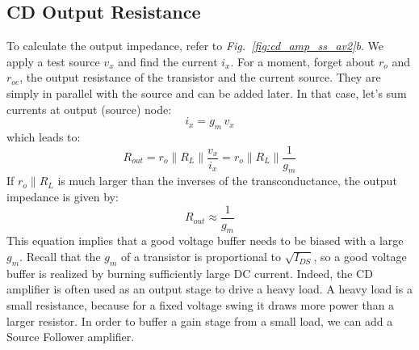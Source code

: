 \subsection{CD Output Resistance}
To calculate the output impedance, refer to \emph{Fig.~\ref{fig:cd_amp_ss_av2}b}.  We apply a test source $v_x$ and find the current $i_x$.  For a moment, forget about $r_o$ and $r_{oc}$, the output resistance of the transistor and the current source.  They are simply in parallel with the source and can be added later.  In that case, let's sum currents at output (source) node:
    \begin{equation}
        i_x = g_m\,v_x
    \end{equation}
which leads to:
    \begin{equation}
        R_{out} = r_o \parallel R_L \parallel \frac{v_x}{i_x} = r_o \parallel R_L \parallel \frac{1}{g_m}
    \end{equation}
If $r_o \parallel R_L$ is much larger than the inverses of the transconductance, the output impedance is given by:
    \begin{equation}
        R_{out} \approx \frac{1}{g_m}
    \end{equation}
This equation implies that a good voltage buffer needs to be biased with a large $g_m$.  Recall that the $g_m$ of a transistor is proportional to $\sqrt{I_{DS}}$, so a good voltage buffer is realized by burning sufficiently large DC current.  Indeed, the CD amplifier is often used as an output stage to drive a heavy load.  A heavy load is a small resistance, because for a fixed voltage swing it draws more power than a larger resistor.  In order to buffer a gain stage from a small load, we can add a Source Follower amplifier.


